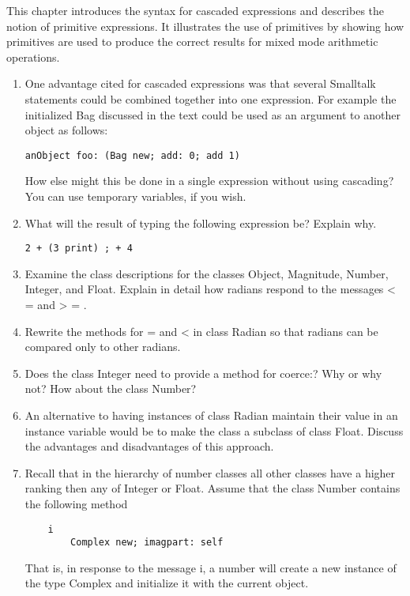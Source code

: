 \secdown

This chapter introduces the syntax for cascaded expressions and describes the
notion of primitive expressions. It illustrates the use of primitives by showing
how primitives are used to produce the correct results for mixed mode arithmetic
operations.






\begin{enumerate}

    \item One advantage cited for cascaded expressions was that several
Smalltalk statements could be combined together into one expression. For example
the initialized Bag discussed in the text could be used as an argument to
another object as follows:
\begin{lstlisting}
anObject foo: (Bag new; add: 0; add 1)
\end{lstlisting}
How else might this be done in a single expression without using cascading? You
can use temporary variables, if you wish.

\item What will the result of typing the following expression be? Explain why.
\begin{lstlisting}
2 + (3 print) ; + 4
\end{lstlisting}

\item Examine the class descriptions for the classes Object, Magnitude, Number,
Integer, and Float. Explain in detail how radians respond to the messages < =
and > = .

\item Rewrite the methods for = and < in class Radian so that radians can be
compared only to other radians.

\item Does the class Integer need to provide a method for coerce:? Why or why
not? How about the class Number?

\item An alternative to having instances of class Radian maintain their value in
an instance variable would be to make the class a subclass of class Float.
Discuss the advantages and disadvantages of this approach.

\item Recall that in the hierarchy of number classes all other classes have a
higher ranking then any of Integer or Float. Assume that the class Number
contains the following method
\begin{lstlisting}
    i 
        Complex new; imagpart: self
\end{lstlisting}
That is, in response to the message i, a number will create a new instance of
the type Complex and initialize it with the current object.


\end{enumerate}
